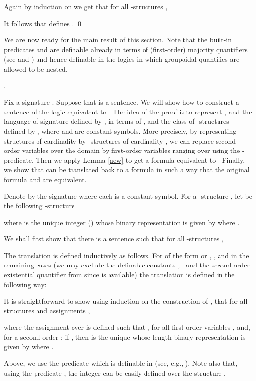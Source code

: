 \documentclass{LMCS}
\begin{document}
 Again by induction on   we get that for all -structures
 ,

 It follows that  defines .
\qed

We are now ready for the main result of this section. Note that the built-in predicates   and  are definable 
already in terms of (first-order) majority quantifiers (see  \cite{baimst90} and \cite{lamcscvo01}) and hence definable in the logics  in which groupoidal quantifies are allowed to be nested.

\begin{thm}\label{11}  .
\end{thm}
\proof 
Fix a signature .
Suppose that   is a sentence. We will show how to construct a sentence  of the logic 
  equivalent to . The idea of the proof is to represent 
 , and the  language of signature  defined by ,  in terms of  , and the class of -structures defined by ,  where   and  are constant symbols. More precisely, by representing  -structures of cardinality  by -structures of cardinality , we can replace second-order variables over the domain  by first-order variables ranging over  using the -predicate. Then we apply Lemma \ref{new} to get a formula     equivalent to . Finally, we show that  can be translated back to a formula   in such a way that the original formula  and  are equivalent.  

Denote by  the signature where each  is a constant symbol. For a -structure
, let  be the following -structure

where  is the unique integer () whose binary representation is given by
 where  .

We shall first show that there is a sentence  such that
for all -structures ,

The translation   is defined inductively as follows.  For  of the form  or , , and in the remaining  cases (we may exclude the definable  constants ,  , and the  second-order existential quantifier  from  since  is available)  the translation is defined in the following way:

It is straightforward to show using induction on the construction of , that for all  -structures  and assignments ,
 
where the  assignment  over  is defined such that  , for all first-order variables , and, for a second-order : if , then  is the unique  whose length  binary representation is given by
 where  .  

Above, we use the predicate   which is definable in  (see, e.g., \cite{imm99}). Note also that, using   the predicate ,  the integer  can be  easily defined over the structure .
 
\end{document}
